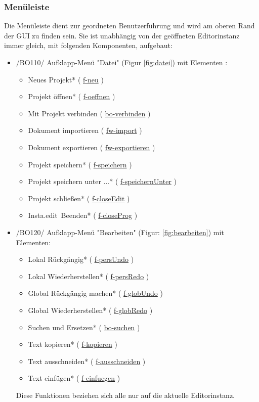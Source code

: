 \documentclass{scrartcl}
\newcommand{\name}{Insta.edit}
\newcommand{\refFunction}[1]{%
  \hyperlink{#1}{\csname #1\endcsname}%
  }
\begin{document}
\subsubsection{Menüleiste}
\label{subsubsec:menuleiste}
Die Menüleiste dient zur geordneten Benutzerführung und wird am oberen Rand der GUI zu finden sein. Sie ist unabhängig von der geöffneten Editorinstanz immer gleich, mit folgenden Komponenten, aufgebaut:
\begin{itemize}
\item /BO110/ Aufklapp-Menü "Datei" (Figur \ref{fig:datei}) mit Elementen :
\begin{itemize}
\item Neues Projekt* (\refFunction{f-neu})
\item Projekt öffnen* (\refFunction{f-oeffnen})
\item Mit Projekt verbinden (\refFunction{bo-verbinden})
\item Dokument importieren (\refFunction{fw-import})
\item Dokument exportieren (\refFunction{fw-exportieren})
\item Projekt speichern* (\refFunction{f-speichern})
\item Projekt speichern unter ...* (\refFunction{f-speichernUnter})
\item Projekt schließen* (\refFunction{f-closeEdit})
\item \name\ Beenden* (\refFunction{f-closeProg})
\end{itemize}

\item /BO120/ Aufklapp-Menü "Bearbeiten" (Figur: \ref{fig:bearbeiten}) mit Elementen:
\begin{itemize}
\item Lokal Rückgängig* (\refFunction{f-persUndo})
\item Lokal Wiederherstellen* (\refFunction{f-persRedo})
\item Global Rückgängig machen* (\refFunction{f-globUndo})
\item Global Wiederherstellen* (\refFunction{f-globRedo})
\item Suchen und Ersetzen* (\refFunction{bo-suchen})
\item Text kopieren* (\refFunction{f-kopieren})
\item Text ausschneiden* (\refFunction{f-ausschneiden})
\item Text einfügen* (\refFunction{f-einfuegen})
\end{itemize}
Diese Funktionen beziehen sich alle nur auf die aktuelle Editorinstanz.



\end{itemize}
\end{document}
